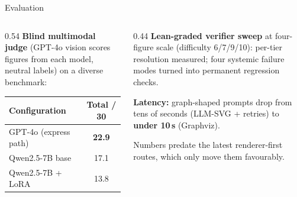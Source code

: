 \documentclass[aspectratio=169,11pt]{beamer}
\begin{document}
\begin{frame}{Evaluation}
  \begin{columns}[T]
  \begin{column}{0.54\textwidth}
  \textbf{Blind multimodal judge} (GPT-4o vision scores figures from each
  model, neutral labels) on a diverse benchmark:
  \vspace{1mm}
  \begin{center}\footnotesize
  \begin{tabular}{lc}
  \hline
  Configuration & Total / 30 \\\hline
  GPT-4o (express path) & \textbf{22.9} \\
  Qwen2.5-7B base & 17.1 \\
  Qwen2.5-7B + LoRA & 13.8 \\\hline
  \end{tabular}
  \end{center}
  \end{column}
  \begin{column}{0.44\textwidth}
  \textbf{Lean-graded verifier sweep} at four-figure scale
  (difficulty 6/7/9/10): per-tier resolution measured; four systemic
  failure modes turned into permanent regression checks.
  \vspace{2mm}\par
  \textbf{Latency:} graph-shaped prompts drop from tens of seconds
  (LLM-SVG + retries) to \textbf{under 10\,s} (Graphviz).
  \vspace{2mm}\par
  \scriptsize\color{kmgrey} Numbers predate the latest renderer-first
  routes, which only move them favourably.
  \end{column}
  \end{columns}
\end{frame}
\end{document}
